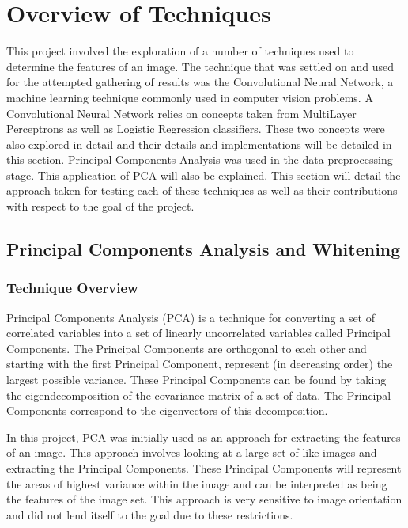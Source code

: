 \documentclass[12pt, titlepage]{article}
\begin{document}
\section{Overview of Techniques}

This project involved the exploration of a number of techniques used to determine the features of an image. The technique that was settled
on and used for the attempted gathering of results was the Convolutional Neural Network, a machine learning technique commonly used in computer
vision problems. A Convolutional Neural Network relies on concepts taken from MultiLayer Perceptrons as well as Logistic Regression classifiers.
These two concepts were also explored in detail and their details and implementations will be detailed in this section. Principal Components Analysis
was used in the data preprocessing stage. This application of PCA will also be explained. This section will detail the approach taken for testing each
of these techniques as well as their contributions with respect to the goal of the project.

\subsection{Principal Components Analysis and Whitening}
  \subsubsection{Technique Overview}
  
  Principal Components Analysis (PCA) is a technique for converting a set of correlated variables into a set of linearly uncorrelated variables
  called Principal Components. The Principal Components are orthogonal to each other and starting with the first Principal Component, represent
  (in decreasing order) the largest possible variance. These Principal Components can be found by taking the eigendecomposition of the covariance
  matrix of a set of data. The Principal Components correspond to the eigenvectors of this decomposition.

  In this project, PCA was initially used as an approach for extracting the features of an image. This approach involves looking at a large set of
  like-images and extracting the Principal Components. These Principal Components will represent the areas of highest variance within the image and
  can be interpreted as being the features of the image set. This approach is very sensitive to image orientation and did not lend itself to the goal
  due to these restrictions.
  
\end{document}
